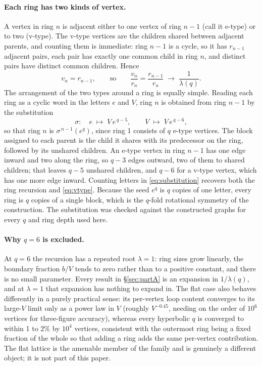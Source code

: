 \documentclass[11pt]{article}
\begin{document}
\paragraph{Each ring has two kinds of vertex.} A vertex in ring $n$ is adjacent either to one vertex of ring $n-1$ (call it e-type) or to two (v-type). The v-type vertices are the children shared between adjacent parents, and counting them is immediate: ring $n-1$ is a cycle, so it has $r_{n-1}$ adjacent pairs, each pair has exactly one common child in ring $n$, and distinct pairs have distinct common children. Hence
\begin{equation}
v_n = r_{n-1},
\qquad\text{so}\qquad
\frac{v_n}{r_n} = \frac{r_{n-1}}{r_n} \;\longrightarrow\; \frac{1}{\lambda(q)} .
\label{eq:vtype}
\end{equation}
The arrangement of the two types around a ring is equally simple. Reading each ring as a cyclic word in the letters $e$ and $V$, ring $n$ is obtained from ring $n-1$ by the substitution
\begin{equation}
\sigma:\quad e\;\mapsto\; V\,e^{\,q-5},\qquad V\;\mapsto\; V\,e^{\,q-6},
\label{eq:substitution}
\end{equation}
so that ring $n$ is $\sigma^{\,n-1}(e^q)$, since ring 1 consists of $q$ e-type vertices. The block assigned to each parent is the child it shares with its predecessor on the ring, followed by its unshared children. An e-type vertex in ring $n-1$ has one edge inward and two along the ring, so $q-3$ edges outward, two of them to shared children; that leaves $q-5$ unshared children, and $q-6$ for a v-type vertex, which has one more edge inward. Counting letters in \eqref{eq:substitution} recovers both the ring recursion and \eqref{eq:vtype}. Because the seed $e^q$ is $q$ copies of one letter, every ring is $q$ copies of a single block, which is the $q$-fold rotational symmetry of the construction. The substitution was checked against the constructed graphs for every $q$ and ring depth used here.

\paragraph{Why $q=6$ is excluded.} At $q=6$ the recursion has a repeated root $\lambda=1$: ring sizes grow linearly, the boundary fraction $b/V$ tends to zero rather than to a positive constant, and there is no small parameter. Every result in \S\ref{sec:partA} is an expansion in $1/\lambda(q)$, and at $\lambda=1$ that expansion has nothing to expand in. The flat case also behaves differently in a purely practical sense: its per-vertex loop content converges to its large-$V$ limit only as a power law in $V$ (roughly $V^{-0.45}$, needing on the order of $10^6$ vertices for three-figure accuracy), whereas every hyperbolic $q$ is converged to within 1 to 2\% by $10^4$ vertices, consistent with the outermost ring being a fixed fraction of the whole so that adding a ring adds the same per-vertex contribution. The flat lattice is the amenable member of the family and is genuinely a different object; it is not part of this paper.
\end{document}
